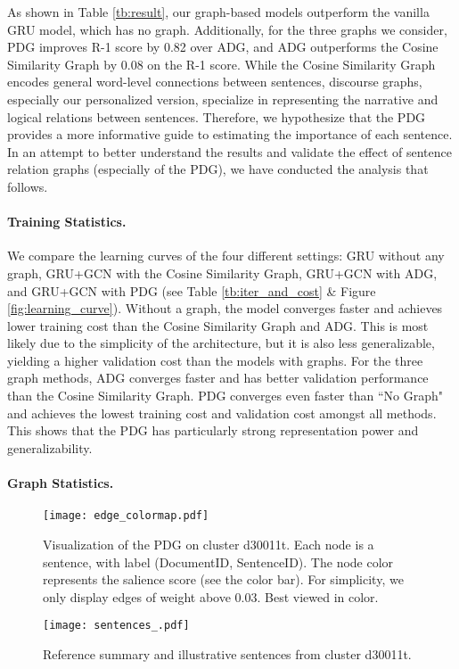 \documentclass[11pt,a4paper]{article}
\begin{document}
As shown in Table \ref{tb:result}, our graph-based models outperform the vanilla GRU model, which has no graph.
Additionally, for the three graphs we consider, PDG improves R-1 score by 0.82 over ADG, and ADG outperforms the Cosine Similarity Graph by 0.08 on the R-1 score.
While the Cosine Similarity Graph encodes general word-level connections between sentences, discourse graphs, especially our personalized version, specialize in representing the narrative and logical relations between sentences.
Therefore, we hypothesize that the PDG provides a more informative guide to estimating the importance of each sentence.
In an attempt to better understand the results and validate the effect of sentence relation graphs (especially of the PDG), we have conducted the analysis that follows.

\paragraph{Training Statistics.}
We compare the learning curves of the four different settings: GRU without any graph, GRU+GCN with the Cosine Similarity Graph, GRU+GCN with ADG, and GRU+GCN with PDG (see Table \ref{tb:iter_and_cost} \& Figure \ref{fig:learning_curve}).
Without a graph, the model converges faster and achieves lower training cost than the Cosine Similarity Graph and ADG. This is most likely due to the simplicity of the architecture, but it is also less generalizable, yielding a higher validation cost than the models with graphs.
For the three graph methods, ADG converges faster and has better validation performance than the Cosine Similarity Graph.
PDG converges even faster than ``No Graph" and achieves the lowest training cost and validation cost amongst all methods.
This shows that the PDG has particularly strong representation power and generalizability.


\paragraph{Graph Statistics.}


\begin{figure*}[h]
\centering
    \texttt{[image: edge\_colormap.pdf]}
    \caption{Visualization of the PDG on cluster d30011t. Each node is a sentence, with label (DocumentID, SentenceID). The node color represents the salience score (see the color bar). For simplicity, we only display edges of weight above 0.03. Best viewed in color.
    }
    \label{fig:d30011t_pdg_visual}
\end{figure*}
\begin{figure}[h]
\hspace{2mm}\texttt{[image: sentences\_.pdf]}
    \caption{Reference summary and illustrative sentences from cluster d30011t.
}
    \vspace{-5mm}
    \label{fig:d30011t_reference}
\end{figure}
\end{document}

